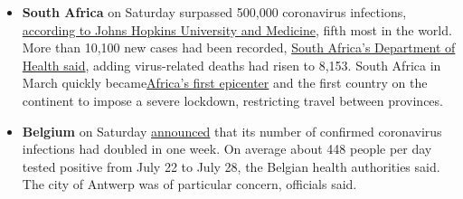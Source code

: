 \begin{itemize}
\item
  \textbf{South Africa} on Saturday surpassed 500,000 coronavirus
  infections, \href{https://coronavirus.jhu.edu/map.html}{according to
  Johns Hopkins University and Medicine}, fifth most in the world. More
  than 10,100 new cases had been recorded,
  \href{https://twitter.com/HealthZA/status/1289655436455510016}{South
  Africa's Department of Health said}, adding virus-related deaths had
  risen to 8,153. South Africa in March quickly
  became\href{https://www.nytimes3xbfgragh.onion/2020/03/27/world/africa/south-africa-coronavirus.html}{Africa's
  first epicenter} and the first country on the continent to impose a
  severe lockdown, restricting travel between provinces.
\item
  \textbf{Belgium} on Saturday
  \href{https://www.info-coronavirus.be/en/news/the-number-of-confirmed-cases-of-covid-19-has-doubled-in-one-week/}{announced}
  that its number of confirmed coronavirus infections had doubled in one
  week. On average about 448 people per day tested positive from July 22
  to July 28, the Belgian health authorities said. The city of Antwerp
  was of particular concern, officials said.
\end{itemize}

